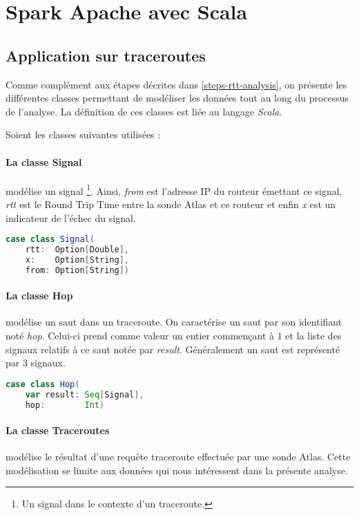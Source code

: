 \section{Spark Apache avec Scala}


\subsection{Application sur traceroutes}
Comme complément aux étapes décrites dans \ref{steps-rtt-analysis}, on présente les différentes classes permettant de modéliser les données tout au long du processus de l'analyse. La définition de ces classes est liée au langage \textit{Scala}. 

Soient les classes suivantes utilisées : 

\paragraph{La classe Signal} modélise un signal \footnote{Un signal dans le contexte d'un traceroute.}. Ainsi, \textit{from} est l'adresse IP du routeur émettant ce signal, \textit{rtt} est le Round Trip Time entre la sonde Atlas et ce routeur et enfin \textit{x} est un indicateur de l'échec du signal.
\begin{lstlisting}[language=scala, caption={La classe Signal en Scala }]
case class Signal(
	rtt:  Option[Double],
	x:    Option[String],
	from: Option[String])

\end{lstlisting}

\paragraph{La classe Hop} modélise un saut dans un traceroute. On caractérise un saut par son identifiant noté \textit{hop}. Celui-ci   prend comme valeur un entier commençant à $1$ et la liste des signaux relatifs à ce saut notée par \textit{result}. Généralement un saut est représenté par $3$ signaux.
\begin{lstlisting}[language=scala, caption={La classe Hop en Scala }]
case class Hop(
	var result: Seq[Signal],
	hop:        Int)
\end{lstlisting}
\paragraph{La classe Traceroutes} modélise le résultat d'une requête traceroute effectuée par une sonde Atlas. Cette modélisation se limite aux données qui nous intéressent dans la présente analyse. 

